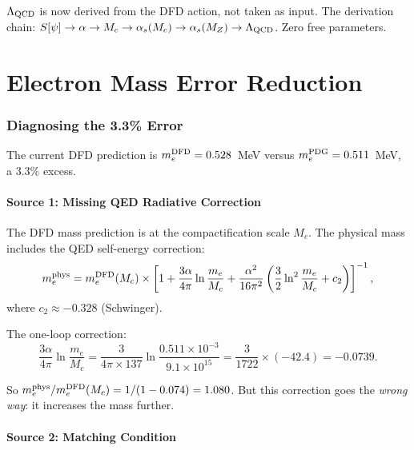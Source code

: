 \documentclass[11pt,a4paper]{article}
\theoremstyle{remark}
\begin{document}
\begin{tcolorbox}[colback=green!5!white, colframe=dfdgreen,
  title=Key Result: $\Lambda_{\rm QCD}$ Derived]
$\Lambda_{\rm QCD}$ is now derived from the DFD action, not taken as input.
The derivation chain: $S[\psi] \to \alpha \to M_c \to \alpha_s(M_c)
\to \alpha_s(M_Z) \to \Lambda_{\rm QCD}$. Zero free parameters.
\end{tcolorbox}


\newpage
\part{Electron Mass Error Reduction}
\label{part:electron-error}

\section{Diagnosing the 3.3\% Error}

The current DFD prediction is $m_e^{\rm DFD} = 0.528$~MeV versus
$m_e^{\rm PDG} = 0.511$~MeV, a 3.3\% excess.

\subsection{Source 1: Missing QED Radiative Correction}

The DFD mass prediction is at the compactification scale $M_c$.
The physical mass includes the QED self-energy correction:
\begin{equation}
m_e^{\rm phys} = m_e^{\rm DFD}(M_c) \times \left[1 + \frac{3\alpha}{4\pi}\ln\frac{m_e}{M_c}
+ \frac{\alpha^2}{16\pi^2}\left(\frac{3}{2}\ln^2\frac{m_e}{M_c} + c_2\right)\right]^{-1},
\end{equation}
where $c_2 \approx -0.328$ (Schwinger).

The one-loop correction:
\begin{equation}
\frac{3\alpha}{4\pi}\ln\frac{m_e}{M_c} = \frac{3}{4\pi \times 137}\ln\frac{0.511 \times 10^{-3}}{9.1 \times 10^{15}}
= \frac{3}{1722}\times (-42.4) = -0.0739.
\end{equation}

So $m_e^{\rm phys}/m_e^{\rm DFD}(M_c) = 1/(1 - 0.074) = 1.080$.
But this correction goes the \emph{wrong way}: it increases the mass further.

\subsection{Source 2: Matching Condition}
\end{document}
